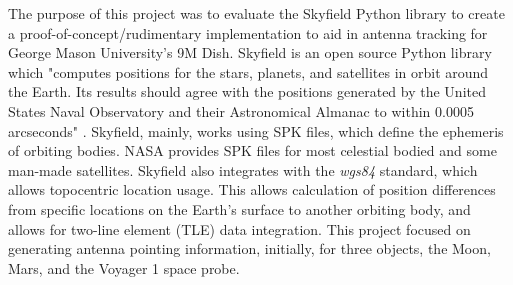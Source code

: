 \documentclass[../main.tex]{subfiles}
\begin{document}
The purpose of this project was to evaluate the Skyfield Python library to create a proof-of-concept/rudimentary implementation to aid in antenna tracking for George Mason University's 9M Dish. Skyfield is an open source Python library which "computes positions for the stars, planets, and satellites in orbit around the Earth. Its results should agree with the positions generated by the United States Naval Observatory and their Astronomical Almanac to within 0.0005 arcseconds" \cite{skyfield-main}. Skyfield, mainly, works using SPK files, which define the ephemeris of orbiting bodies\cite{SPICE-concept}. NASA provides SPK files for most celestial bodied and some man-made satellites. Skyfield also integrates with the \textit{wgs84} standard, which allows topocentric location usage. This allows calculation of position differences from specific locations on the Earth's surface to another orbiting body, and allows for two-line element (TLE) data integration\cite{skyfield-main}. This project focused on generating antenna pointing information, initially, for three objects, the Moon, Mars, and the Voyager 1 space probe. 
\end{document}
